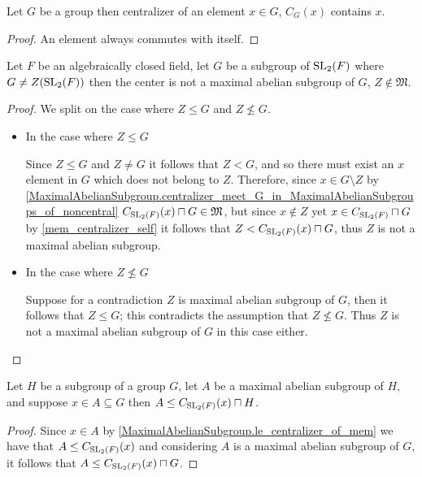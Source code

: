 \begin{corollary}
  \label{mem_centralizer_self}
  \leanok
 Let $G$ be a group then centralizer of an element $x \in G$, $C_G(x)$ contains $x$. 
\end{corollary}
\begin{proof}
  \leanok
  An element always commutes with itself.
\end{proof}


\begin{lemma}
  \label{MaximalAbelianSubgroup.center_not_mem}
  \leanok
  Let $F$ be an algebraically closed field, let $G$ be a subgroup of $\operatorname{SL}_2(F)$ where $G \ne Z(\operatorname{SL}_2(F))$ then the 
  center is not a maximal abelian subgroup of $G$, $Z \notin \mathfrak{M}$.
\end{lemma}
\begin{proof}
 \leanok
  We split on the case where $Z \le G$ and $Z \not\le G$.
  \begin{itemize}
    \item In the case where $Z \le G$
    
    Since $Z \le G$ and $Z \ne G$ it follows that $Z < G$, and so there must exist an $x$ element in $G$ which does not
    belong to $Z$. Therefore, since $x \in G \setminus Z$ by \ref{MaximalAbelianSubgroup.centralizer_meet_G_in_MaximalAbelianSubgroups_of_noncentral}
    $C_{\operatorname{SL}_2(F)}(x) \sqcap G \in \mathfrak{M}$, but since $x \notin Z$ yet $x \in C_{\operatorname{SL}_2(F)} \sqcap G$ by \ref{mem_centralizer_self} 
    it follows that $Z < C_{\operatorname{SL}_2(F)}(x) \sqcap G$, thus $Z$ is not a maximal abelian subgroup.
    
    \item In the case where $Z \not\le G$
    
    Suppose for a contradiction $Z$ is maximal abelian subgroup of $G$, then it follows that 
    $Z \le G$; this contradicts the assumption that $Z \not\le G$. Thus $Z$ is not a maximal abelian subgroup of $G$ in this case either.
  \end{itemize}
\end{proof}




\begin{lemma}
  \label{MaximalAbelianSubgroup.le_centralizer_meet}
  \leanok
  Let $H$ be a subgroup of a group $G$, let $A$ be a maximal abelian subgroup of $H$, and suppose $x \in A \subseteq G$ then 
  $A \le C_{\operatorname{SL}_2(F)}(x) \sqcap H$.
\end{lemma}
\begin{proof}
  \leanok

  Since $x \in A$ by \ref{MaximalAbelianSubgroup.le_centralizer_of_mem} we have that $A \le C_{\operatorname{SL}_2(F)}(x)$ and considering
  $A$ is a maximal abelian subgroup of $G$, it follows that $A \le C_{\operatorname{SL}_2(F)}(x) \sqcap G$.
\end{proof}


